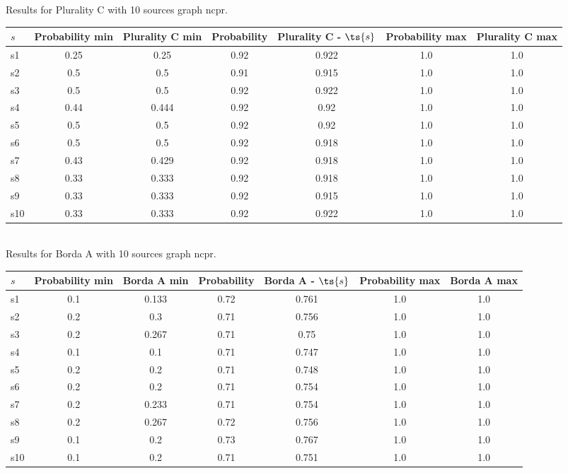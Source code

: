 \documentclass{article}
\begin{document}
\noindent Results for Plurality C with 10 sources graph ncpr.

\noindent\begin{tabular}{|l|c|c|c|c|c|c|}
\hline
$s$& Probability min & Plurality C min & Probability & Plurality C - $\ts{s}$ & Probability max & Plurality C max\\
\hline
s1 &0.25 & 0.25 & 0.92 & 0.922 & 1.0 & 1.0\\
\hline
s2 &0.5 & 0.5 & 0.91 & 0.915 & 1.0 & 1.0\\
\hline
s3 &0.5 & 0.5 & 0.92 & 0.922 & 1.0 & 1.0\\
\hline
s4 &0.44 & 0.444 & 0.92 & 0.92 & 1.0 & 1.0\\
\hline
s5 &0.5 & 0.5 & 0.92 & 0.92 & 1.0 & 1.0\\
\hline
s6 &0.5 & 0.5 & 0.92 & 0.918 & 1.0 & 1.0\\
\hline
s7 &0.43 & 0.429 & 0.92 & 0.918 & 1.0 & 1.0\\
\hline
s8 &0.33 & 0.333 & 0.92 & 0.918 & 1.0 & 1.0\\
\hline
s9 &0.33 & 0.333 & 0.92 & 0.915 & 1.0 & 1.0\\
\hline
s10 &0.33 & 0.333 & 0.92 & 0.922 & 1.0 & 1.0\\
\hline
\end{tabular}\\

\noindent Results for Borda A with 10 sources graph ncpr.

\noindent\begin{tabular}{|l|c|c|c|c|c|c|}
\hline
$s$& Probability min & Borda A min & Probability & Borda A - $\ts{s}$ & Probability max & Borda A max\\
\hline
s1 &0.1 & 0.133 & 0.72 & 0.761 & 1.0 & 1.0\\
\hline
s2 &0.2 & 0.3 & 0.71 & 0.756 & 1.0 & 1.0\\
\hline
s3 &0.2 & 0.267 & 0.71 & 0.75 & 1.0 & 1.0\\
\hline
s4 &0.1 & 0.1 & 0.71 & 0.747 & 1.0 & 1.0\\
\hline
s5 &0.2 & 0.2 & 0.71 & 0.748 & 1.0 & 1.0\\
\hline
s6 &0.2 & 0.2 & 0.71 & 0.754 & 1.0 & 1.0\\
\hline
s7 &0.2 & 0.233 & 0.71 & 0.754 & 1.0 & 1.0\\
\hline
s8 &0.2 & 0.267 & 0.72 & 0.756 & 1.0 & 1.0\\
\hline
s9 &0.1 & 0.2 & 0.73 & 0.767 & 1.0 & 1.0\\
\hline
s10 &0.1 & 0.2 & 0.71 & 0.751 & 1.0 & 1.0\\
\hline
\end{tabular}\\
\end{document}
